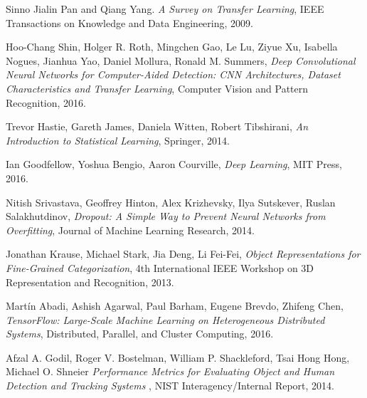 \documentclass [11pt,letterpaper ,twoside ,openany ]{report}
\begin{document}
\begin{thebibliography}{9}
          Sinno Jialin Pan and Qiang Yang.
          \textit{A Survey on Transfer Learning},
          IEEE Transactions on Knowledge and Data Engineering,
          2009.                                                  

          Hoo-Chang Shin, Holger R. Roth, Mingchen Gao, Le Lu, Ziyue Xu, Isabella Nogues, Jianhua Yao, Daniel Mollura, Ronald M. Summers,
          \textit{Deep Convolutional Neural Networks for Computer-Aided Detection: CNN Architectures, Dataset Characteristics and Transfer Learning},
          Computer Vision and Pattern Recognition,
          2016.                              

          Trevor Hastie, Gareth James, Daniela Witten, Robert Tibshirani,
          \textit{An Introduction to Statistical Learning},
          Springer,
          2014.                                        

          Ian Goodfellow, Yoshua Bengio, Aaron Courville,
          \textit{Deep Learning},
          MIT Press,
          2016.                                        
           
          Nitish Srivastava, Geoffrey Hinton, Alex Krizhevsky, Ilya Sutskever, Ruslan Salakhutdinov,
          \textit{Dropout: A Simple Way to Prevent Neural Networks from Overfitting},
          Journal of Machine Learning Research,
          2014.                               

           Jonathan Krause, Michael Stark, Jia Deng, Li Fei-Fei,
          \textit{Object Representations for Fine-Grained Categorization},
          4th International IEEE Workshop on  3D Representation and Recognition,
          2013.                                         

           Martín Abadi, Ashish Agarwal, Paul Barham, Eugene Brevdo, Zhifeng Chen,
          \textit{TensorFlow: Large-Scale Machine Learning on Heterogeneous Distributed Systems},
          Distributed, Parallel, and Cluster Computing,
          2016.                                                   

          Afzal A. Godil, Roger V. Bostelman, William P. Shackleford, Tsai Hong Hong, Michael O. Shneier 
          \textit{Performance Metrics for Evaluating Object and Human Detection and Tracking Systems },
          NIST Interagency/Internal Report,
          2014.                 


\end{thebibliography}
\end{document}
